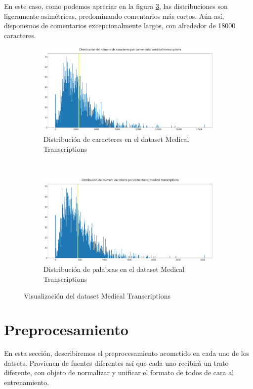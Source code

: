En este caso, como podemos apreciar en la figura \ref{fig:sum_mdtr}, las distribuciones son ligeramente asimétricas, predominando comentarios más cortos. Aún así, disponemos de comentarios excepcionalmente largos, con alrededor de 18000 caracteres.

\begin{figure}[h!]
	\centering
	\begin{subfigure}[t]{0.95\textwidth}
		\centering
		\includegraphics[width=.9\textwidth]{media/char_hist_mdtr.pdf}
		\caption{Distribución de caracteres en el dataset Medical Transcriptions}
		\label{fig:char_hist_mdtr}
	\end{subfigure}

	~
	\begin{subfigure}[t]{0.95\textwidth}
		\centering
		\includegraphics[width=.9\textwidth]{media/token_hist_mdtr.pdf}
		\caption{Distribución de palabras en el dataset Medical Transcriptions}
		\label{fig:token_hist_mdtr}
	\end{subfigure}

	\caption{Visualización del dataset Medical Transcriptions}
	\label{fig:sum_mdtr}
\end{figure}

\section{Preprocesamiento}
En esta sección, describiremos el preprocesamiento acometido en cada uno de los datsets. Provienen de fuentes diferentes así que cada uno recibirá un trato diferente, con objeto de normalizar y unificar el formato de todos de cara al entrenamiento.


